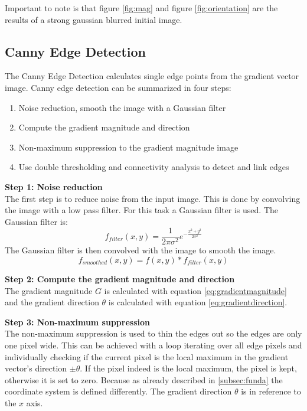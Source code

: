     Important to note is that figure \ref{fig:mag} and figure \ref{fig:orientation} are the results of a strong gaussian blurred initial image. 
    \subsection{Canny Edge Detection } 
    The Canny Edge Detection \cite{gonzalez_canny_2018} calculates single edge points from the gradient vector image.  
    Canny edge detection can be summarized in four steps: 
    \begin{enumerate}
        \item Noise reduction, smooth the image with a Gaussian filter
        \item Compute the gradient magnitude and direction
        \item Non-maximum suppression to the gradient magnitude image
        \item Use double thresholding and connectivity analysis to detect and link edges
    \end{enumerate}
\textbf{Step 1: Noise reduction} \\
The first step is to reduce noise from the input image. This is done by convolving the image with a low pass filter. For this task a Gaussian filter is used. The Gaussian filter is:
\begin{equation}
    f_{filter}(x,y) = \frac{1}{2\pi\sigma^2}e^{-\frac{x^2+y^2}{2\sigma^2}}
\end{equation}
The Gaussian filter is then convolved with the image to smooth the image. 
\begin{equation}
    f_{smoothed}(x,y) = f(x,y) * f_{filter}(x,y)
\end{equation} 

\textbf{Step 2: Compute the gradient magnitude and direction} \\
The gradient magnitude $G$ is calculated with equation \ref{eq:gradientmagnitude} and the gradient direction $\theta$ is calculated with equation \ref{eq:gradientdirection}.

\textbf{Step 3: Non-maximum suppression} \\
The non-maximum suppression is used to thin the edges out so the edges are only one pixel wide. This can be achieved with a loop iterating over all edge pixels and individually checking if the current pixel is the local maximum in the gradient vector's direction $\pm \theta$. If the pixel indeed is the local maximum, the pixel is kept, otherwise it is set to zero. Because as already described in \ref{subsec:funda} the coordinate system is defined differently. The gradient direction $\theta$ is in reference to the $x$ axis.

